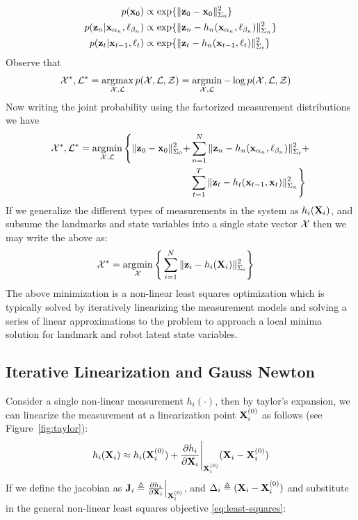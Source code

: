 \begin{align}
    p(\mathbf{x}_0) &\propto \exp\{ \|\mathbf{z}_0 - \mathbf{x}_0\|^2_{\Sigma_0}\}\\
    p(\mathbf{z}_n | \mathbf{x}_{\alpha_n}, \ell_{\beta_n}) &\propto \exp\{ \|\mathbf{z}_n - h_n(\mathbf{x}_{\alpha_n}, \ell_{\beta_n})\|^2_{\Sigma_n}\}\\
    p(\mathbf{z}_t | \mathbf{x}_{t-1}, \ell_{t}) &\propto \exp\{ \|\mathbf{z}_t - h_n(\mathbf{x}_{t-1}, \ell_{t})\|^2_{\Sigma_t}\}
\end{align}
Observe that
\begin{align}
    \mathcal{X}^*, \mathcal{L}^* &= \operatorname*{\arg\!\max}_{\mathcal{X}, \mathcal{L}} p(\mathcal{X}, \mathcal{L}, \mathcal{Z}) = \operatorname*{\arg\!\min}_{\mathcal{X}, \mathcal{L}} - \log p(\mathcal{X}, \mathcal{L}, \mathcal{Z})
\end{align}
Now writing the joint probability using the factorized measurement distributions we have
\begin{align*}
    \mathcal{X}^*, \mathcal{L}^* = \operatorname*{\arg\!\min}_{\mathcal{X}, \mathcal{L}} \Bigg \{ \| \mathbf{z}_0 - \mathbf{x}_0 \|_{\Sigma_0}^2 + &\sum_{n=1}^{N} \| \mathbf{z}_n - h_n(\mathbf{x}_{\alpha_n}, \ell_{\beta_n}) \|_{\Sigma_t}^2 + \\&\sum_{t=1}^{T}\| \mathbf{z}_t - h_t(\mathbf{x}_{t-1}, \mathbf{x}_{t}) \|_{\Sigma_n}^2 \Bigg \}
\end{align*}
If we generalize the different types of measurements in the system as $h_i(\mathbf{X}_i)$, and subsume the landmarks and state variables into a single state vector $\mathcal{X}$ then we may write the above as:
\begin{align}
    \mathcal{X}^* = \operatorname*{\arg\!\min}_{\mathcal{X}} \Bigg \{ &\sum_{i=1}^{N} \| \mathbf{z}_i - h_i(\mathbf{X}_i) \|_{\Sigma_i}^2 \Bigg \} \label{eq:least-squares}
\end{align}
The above minimization is a non-linear least squares optimization which is typically solved by iteratively linearizing the measurement models and solving a series of linear approximations to the problem to approach a local minima solution for landmark and robot latent state variables.

\subsection{Iterative Linearization and Gauss Newton}


Consider a single non-linear measurement $h_i( \cdot )$, then by taylor's expansion, we can linearize the measurement at a linearization point $\mathbf{X}_i^{(0)}$ as follows (see Figure~\ref{fig:taylor}):
\begin{align}
    h_i(\mathbf{X}_i) \approx h_i(\mathbf{X}_i^{(0)}) + \frac{\partial h_i}{\partial \mathbf{X}_i} \Bigg |_{\mathbf{X}_i^{(0)}} (\mathbf{X}_i - \mathbf{X}_i^{(0)})
\end{align}
If we define the jacobian as $\mathbf{J}_i \triangleq \frac{\partial h_i}{\partial \mathbf{X}_i} \Big|_{\mathbf{X}_i^{(0)}}$, and $\Delta_i \triangleq (\mathbf{X}_i - \mathbf{X}_i^{(0)})$ and substitute in the general non-linear least squares objective \ref{eq:least-squares}:

